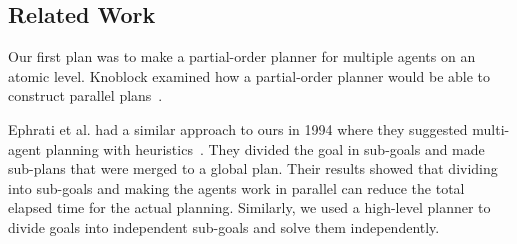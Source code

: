 \subsection{Related Work}
\label{sec:related work}
Our first plan was to make a partial-order planner for multiple agents on an atomic level.
Knoblock examined how a partial-order planner would be able to construct parallel plans~\cite{knoblock1994generating}.

Ephrati et al. had a similar approach to ours in 1994 where they suggested multi-agent planning with heuristics~\cite{ephrati1994divide}.
They divided the goal in sub-goals and made sub-plans that were merged to a global plan.
Their results showed that dividing into sub-goals and making the agents work in parallel can reduce the total elapsed time for the actual planning.
Similarly, we used a high-level planner to divide goals into independent sub-goals and solve them independently.




